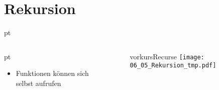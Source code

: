 \livecoding


\subtitle{Kapitel 6: wie Funktionen funktionieren}


\section{Rekursion}
\begin{frame}[t]
	\slidehead

	 pt
	\begin{columns}
		\begin{column}{4.5cm}
			 pt
			\begin{itemize}
				\item Funktionen können sich selbst aufrufen
			\end{itemize}
		\end{column}

		\begin{column}{7cm}
			\begin{figure}
				\ifcsname vorkursRecurse\endcsname
					\texttt{[image: 06\_05\_Rekursion\_tmp.pdf]}
				\fi
			\end{figure}
		\end{column}
	\end{columns}
\end{frame}

